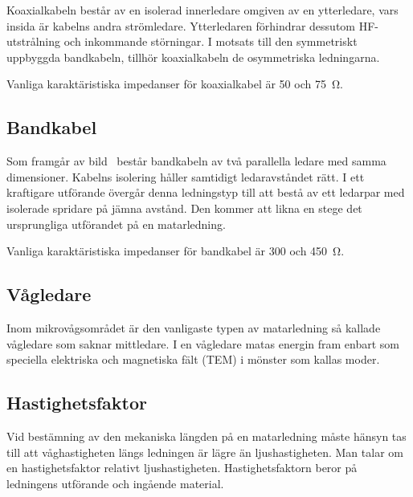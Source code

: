 Koaxialkabeln består av en isolerad innerledare omgiven av en ytterledare, vars
insida är kabelns andra strömledare.
Ytterledaren förhindrar dessutom HF-utstrålning och inkommande störningar.
I motsats till den symmetriskt uppbyggda bandkabeln, tillhör
koaxialkabeln de osymmetriska ledningarna.

Vanliga karaktäristiska impedanser för koaxialkabel är 50 och \qty{75}{\ohm}.

\subsection{Bandkabel}


Som framgår av bild~ består bandkabeln av två parallella
ledare med samma dimensioner.
Kabelns isolering håller samtidigt ledaravståndet rätt.
I ett kraftigare utförande övergår denna ledningstyp till att bestå av ett
ledarpar med isolerade spridare på jämna avstånd.
Den kommer att likna en stege det ursprungliga utförandet på en matarledning.

Vanliga karaktäristiska impedanser för bandkabel är 300 och \qty{450}{\ohm}.

\subsection{Vågledare}

Inom mikrovågsområdet är den vanligaste typen av matarledning så kallade
vågledare som saknar mittledare.
I en vågledare matas energin fram enbart som speciella elektriska och
magnetiska fält (TEM) i mönster som kallas moder.

\subsection{Hastighetsfaktor}

Vid bestämning av den mekaniska längden på en matarledning måste hänsyn tas
till att våghastigheten längs ledningen är lägre än ljushastigheten.
Man talar om en hastighetsfaktor relativt ljushastigheten.
Hastighetsfaktorn beror på ledningens utförande och ingående material.


